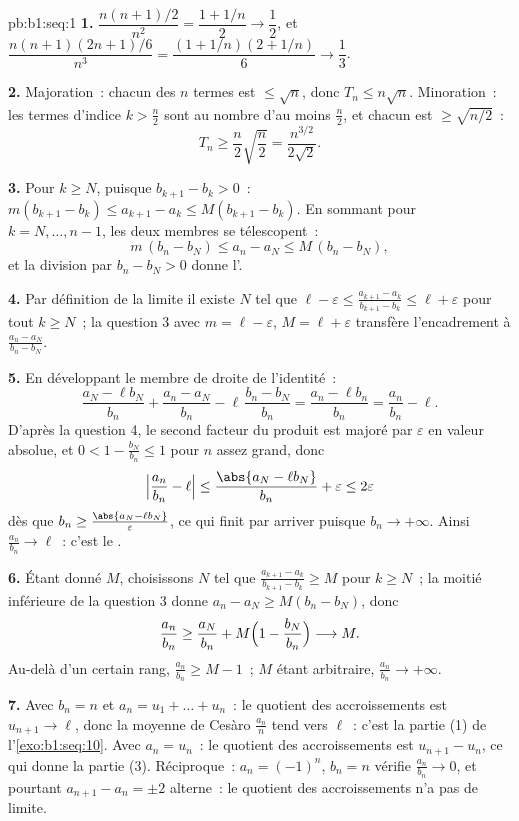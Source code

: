 \begin{solution}{pb:b1:seq:1}
\textbf{1.} $\dfrac{n(n+1)/2}{n^2} = \dfrac{1 + 1/n}{2} \to
\dfrac12$, et $\dfrac{n(n+1)(2n+1)/6}{n^3} = \dfrac{(1 +
1/n)(2 + 1/n)}{6} \to \dfrac13$.

\textbf{2.} Majoration~: chacun des $n$ termes est $\leq \sqrt n$,
donc $T_n \leq n\sqrt n$. Minoration~: les termes d'indice $k >
\frac n2$ sont au nombre d'au moins $\frac n2$, et chacun est $\geq
\sqrt{n/2}$~:
\[
T_n \geq \frac n2 \sqrt{\frac n2} = \frac{n^{3/2}}{2\sqrt 2} .
\]

\textbf{3.} Pour $k \geq N$, puisque $b_{k+1} - b_k > 0$~:
$m(b_{k+1} - b_k) \leq a_{k+1} - a_k \leq M(b_{k+1} - b_k)$. En
sommant pour $k = N, \dots, n - 1$, les deux membres se télescopent~:
\[
m\,(b_n - b_N) \leq a_n - a_N \leq M\,(b_n - b_N),
\]
et la division par $b_n - b_N > 0$ donne l'.

\textbf{4.} Par définition de la limite il existe $N$ tel que $\ell -
\varepsilon \leq \frac{a_{k+1} - a_k}{b_{k+1} - b_k} \leq \ell +
\varepsilon$ pour tout $k \geq N$~; la question 3 avec $m = \ell -
\varepsilon$, $M = \ell + \varepsilon$ transfère l'encadrement à
$\frac{a_n - a_N}{b_n - b_N}$.

\textbf{5.} En développant le membre de droite de l'identité~:
\[
\frac{a_N - \ell b_N}{b_n} + \frac{a_n - a_N}{b_n} -
\ell\,\frac{b_n - b_N}{b_n}
= \frac{a_n - \ell b_n}{b_n} = \frac{a_n}{b_n} - \ell .
\]
D'après la question 4, le second facteur du produit est majoré par
$\varepsilon$ en valeur absolue, et $0 < 1 - \frac{b_N}{b_n}
\leq 1$ pour $n$ assez grand, donc
\[
\Bigl|\frac{a_n}{b_n} - \ell\Bigr|
\leq \frac{\abs{a_N - \ell b_N}}{b_n} + \varepsilon
\leq 2\varepsilon
\]
dès que $b_n \geq \frac{\abs{a_N - \ell b_N}}{\varepsilon}$, ce qui
finit par arriver puisque $b_n \to +\infty$. Ainsi
$\frac{a_n}{b_n} \to \ell$~: c'est le .

\textbf{6.} Étant donné $M$, choisissons $N$ tel que $\frac{a_{k+1} -
a_k}{b_{k+1} - b_k} \geq M$ pour $k \geq N$~; la moitié inférieure de
la question 3 donne $a_n - a_N \geq M(b_n - b_N)$, donc
\[
\frac{a_n}{b_n} \geq \frac{a_N}{b_n} +
M\Bigl(1 - \frac{b_N}{b_n}\Bigr) \longrightarrow M .
\]
Au-delà d'un certain rang, $\frac{a_n}{b_n} \geq M - 1$~; $M$ étant
arbitraire, $\frac{a_n}{b_n} \to +\infty$.

\textbf{7.} Avec $b_n = n$ et $a_n = u_1 + \dots + u_n$~: le quotient
des accroissements est $u_{n+1} \to \ell$, donc la moyenne de Cesàro
$\frac{a_n}{n}$ tend vers $\ell$~: c'est la partie (1) de
l'\cref{exo:b1:seq:10}. Avec $a_n = u_n$~: le quotient des
accroissements est $u_{n+1} - u_n$, ce qui donne la partie (3).
Réciproque~: $a_n = (-1)^n$, $b_n = n$ vérifie $\frac{a_n}{b_n} \to
0$, et pourtant $a_{n+1} - a_n = \pm 2$ alterne~: le quotient des
accroissements n'a pas de limite.


\end{solution}
